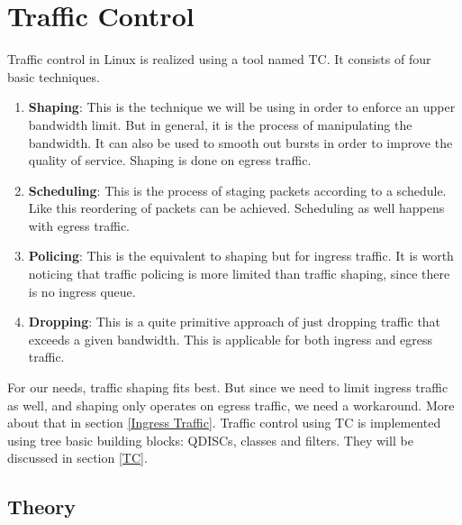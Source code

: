 \chapter{Traffic Control}
Traffic control in Linux is realized using a tool named \acs{TC}. It consists of four basic techniques.

\begin{enumerate}
\item \textbf{Shaping}: This is the technique we will be using in order to enforce an upper bandwidth limit. But in general, it is the process of manipulating the bandwidth. It can also be used to smooth out bursts in order to improve the quality of service. Shaping is done on egress traffic.

\item \textbf{Scheduling}: This is the process of staging packets according to a schedule. Like this reordering of packets can be achieved. Scheduling as well happens with egress traffic.

\item \textbf{Policing}: This is the equivalent to shaping but for ingress traffic. It is worth noticing that traffic policing is more limited than traffic shaping, since there is no ingress queue.

\item \textbf{Dropping}: This is a quite primitive approach of just dropping traffic that exceeds a given bandwidth. This is applicable for both ingress and egress traffic.
\end{enumerate}

For our needs, traffic shaping fits best. But since we need to limit ingress traffic as well, and shaping only operates on egress traffic, we need a workaround. More about that in section  \ref{Ingress Traffic}. Traffic control using \acs{TC} is implemented using tree basic building blocks: \acp{QDISC}, classes and filters. They will be discussed in section \ref{TC}.

\section{Theory}
